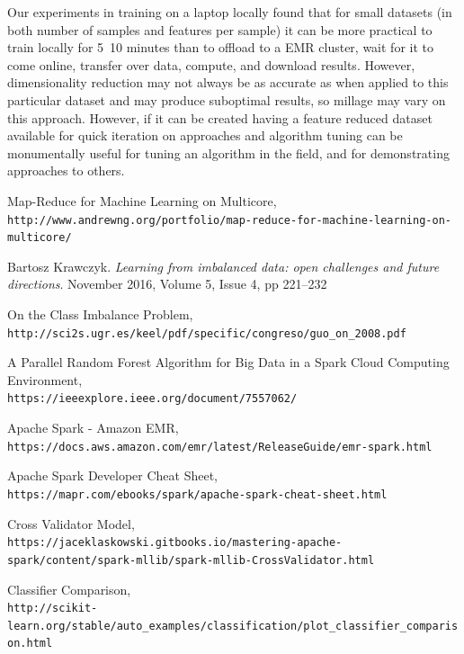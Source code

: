 \documentclass{neu_handout}
\begin{document}
Our experiments in training on a laptop locally found that for small datasets (in both number of samples and features per sample) it can be more practical to train locally for 5~10 minutes than to offload to a EMR cluster, wait for it to come online, transfer over data, compute, and download results. However, dimensionality reduction may not always be as accurate as when applied to this particular dataset and may produce suboptimal results, so millage may vary on this approach. However, if it can be created having a feature reduced dataset available for quick iteration on approaches and algorithm tuning can be monumentally useful for tuning an algorithm in the field, and for demonstrating approaches to others.


\newpage

\begin{thebibliography}{9}

Map-Reduce for Machine Learning on Multicore,
\\\texttt{http://www.andrewng.org/portfolio/map-reduce-for-machine-learning-on-multicore/}

 Bartosz Krawczyk. \textsl{Learning from imbalanced data: open challenges and future directions}. November 2016, Volume 5, Issue 4, pp 221–232

On the Class Imbalance Problem,
\\\texttt{http://sci2s.ugr.es/keel/pdf/specific/congreso/guo\_on\_2008.pdf}

A Parallel Random Forest Algorithm for Big Data in a Spark Cloud Computing Environment,
\\\texttt{https://ieeexplore.ieee.org/document/7557062/}

Apache Spark - Amazon EMR,
\\\texttt{https://docs.aws.amazon.com/emr/latest/ReleaseGuide/emr-spark.html}

Apache Spark Developer Cheat Sheet,
\\\texttt{https://mapr.com/ebooks/spark/apache-spark-cheat-sheet.html}

Cross Validator Model,
\\\texttt{https://jaceklaskowski.gitbooks.io/mastering-apache-spark/content/spark-mllib/spark-mllib-CrossValidator.html}

Classifier Comparison,
\\\texttt{http://scikit-learn.org/stable/auto\_examples/classification/plot\_classifier\_comparison.html}


\end{thebibliography}
\end{document}
